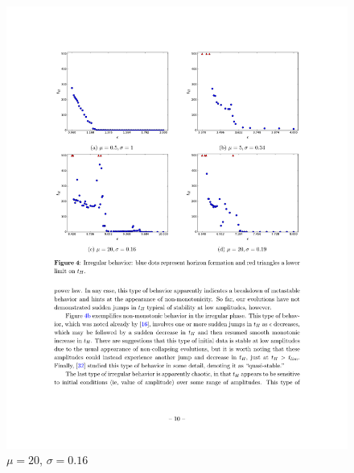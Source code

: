 \documentclass[mathserif,10pt]{beamer}
\begin{document}
{{\begin{columns}
\begin{figure}
	\includegraphics[width=\textwidth]{m20w016} \\ $\mu = 20$, $\sigma = 0.16$
  	\end{figure}
  \end{columns}
}

}
\end{document}
